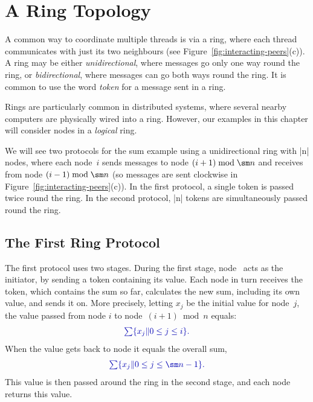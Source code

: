 \section{A Ring Topology}

A common way to coordinate multiple threads is via a ring, where each thread communicates with just its two neighbours (see
Figure~\ref{fig:interacting-peers}(c)).  A ring may be either
\emph{unidirectional}, where messages go only one way round the ring, or
\emph{bidirectional}, where messages can go both ways round the ring.  It is
common to use the word \emph{token} for a message sent in a ring.

Rings are particularly common in distributed systems, where several nearby
computers are physically wired into a ring.  However, our examples in this
chapter will consider nodes in a \emph{logical} ring.  

We will see two protocols for the sum example using a unidirectional ring with
|n| nodes, where each node~$i$ sends messages to node $(i+1) \bmod \sm n$ and
receives from node $(i-1) \bmod \sm n$ (so messages are sent clockwise in
Figure~\ref{fig:interacting-peers}(c)).  In the first protocol, a single token
is passed twice round the ring.  In the second protocol, |n| tokens are
simultaneously passed round the ring.


\subsection{The First Ring Protocol}

The first protocol uses two stages.  During the first stage, node~
acts as the initiator, by sending a token containing its value.  Each node in
turn receives the token, which contains the sum so far, calculates the new
sum, including its own value, and sends it on.  More precisely, letting $x_j$
be the initial value for node~$j$, the value passed from node $i$ to
node~$(i+1) \bmod n$ equals:
%
\[\mstyle
\textstyle\sum \set{x_j \| 0 \le j \le i}.
\]
When the value gets back to node  it equals the overall sum, 
\[\mstyle
\textstyle\sum \set{x_j \| 0 \le j \le \sm n-1}.
\]
This value is then passed around the ring in the second stage, and each node
returns this value.


